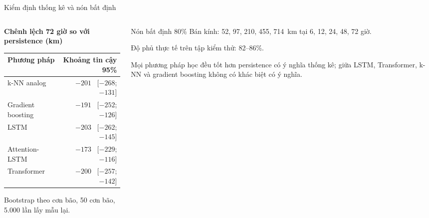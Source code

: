 \documentclass[aspectratio=169, 11pt, xcolor={table}]{beamer}
\begin{document}
\begin{frame}{Kiểm định thống kê và nón bất định}
  \begin{columns}[T]
    \begin{column}{0.54\textwidth}
      \textbf{Chênh lệch 72 giờ so với persistence (km)}\\[2pt]
      \small
      \begin{tabular}{lr}
        \toprule
        \textbf{Phương pháp} & \textbf{Khoảng tin cậy 95\%} \\
        \midrule
        k-NN analog       & $-201$ \ [$-268$; $-131$] \\
        Gradient boosting & $-191$ \ [$-252$; $-126$] \\
        LSTM              & $-203$ \ [$-262$; $-145$] \\
        Attention-LSTM    & $-173$ \ [$-229$; $-116$] \\
        Transformer       & $-200$ \ [$-257$; $-142$] \\
        \bottomrule
      \end{tabular}

      \vspace{0.3em}
      Bootstrap theo cơn bão, 50 cơn bão, 5.000 lần lấy mẫu lại.
    \end{column}
    \begin{column}{0.42\textwidth}
      \begin{block}{Nón bất định 80\%}
        Bán kính: 52, 97, 210, 455, 714~km tại 6, 12, 24, 48, 72 giờ.

        Độ phủ thực tế trên tập kiểm thử: \alert{82--86\%}.
      \end{block}
      Mọi phương pháp học đều tốt hơn persistence có ý nghĩa thống kê; giữa
      LSTM, Transformer, k-NN và gradient boosting không có khác biệt có ý
      nghĩa.
    \end{column}
  \end{columns}
\end{frame}
\end{document}
